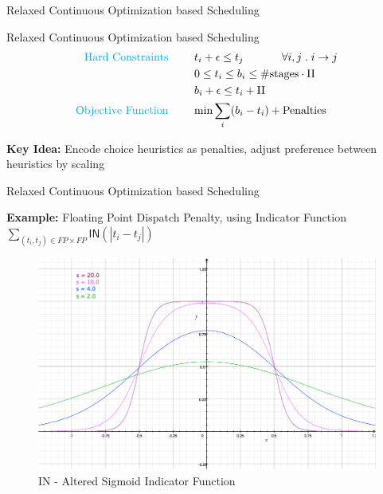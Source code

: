 \documentclass{beamer}
\begin{document}
\begin{darkframes}
\begin{frame}{Relaxed Continuous Optimization based Scheduling}
\end{frame}

\begin{frame}{Relaxed Continuous Optimization based Scheduling}
    \begin{align}
    \text{\color{cyan} Hard Constraints \qquad}  & t_i + \epsilon \leq t_j  & \hspace{-9em} \forall i,j \; . \; i \rightarrow j \\
								 & 0 \leq t_i \leq b_i \leq \#\text{stages} \cdot \textrm{II}  & \\
								 & b_i + \epsilon \leq t_i + \textrm{II} \\
    \text{\color{cyan} Objective Function \qquad}   & \text{min} \sum_{i} (b_i - t_i) + \text{Penalties}
    \end{align}
    
    {\bf \color{green} Key Idea:} Encode choice heuristics as penalties, adjust preference between heuristics by scaling
\end{frame}

\begin{frame}{Relaxed Continuous Optimization based Scheduling}

    {\bf \color{green} Example:} Floating Point Dispatch Penalty, using Indicator Function  \\
    \qquad $ \sum_{(t_i, t_j) \in FP \times FP} \mathsf{IN}(|t_i - t_j|)$ 
    \begin{figure}
        \includegraphics[scale=0.2]{figures/sigmoid}
        \caption{\textrm{IN} - Altered Sigmoid Indicator Function}
    \end{figure}

\end{frame}


\end{darkframes}
\end{document}
